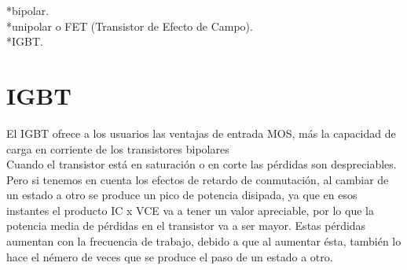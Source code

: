 \documentclass[12pt,a4paper]{article}
\begin{document}
*bipolar.\\
*unipolar o FET (Transistor de Efecto de Campo).\\
*IGBT.\\

\section{IGBT}
El IGBT ofrece a los usuarios las ventajas de entrada MOS, m\'as la capacidad de carga en corriente de los transistores bipolares\\

Cuando el transistor est\'a en saturaci\'on o en corte las p\'erdidas son despreciables. Pero si tenemos en cuenta los efectos de retardo de conmutaci\'on, al cambiar de un estado a otro se produce un pico de potencia disipada, ya que en esos instantes el producto IC x VCE va a tener un valor apreciable, por lo que la potencia media de p\'erdidas en el transistor va a ser mayor. Estas p\'erdidas aumentan con la frecuencia de trabajo, debido a que al aumentar \'esta, tambi\'en lo hace el n\'emero de veces que se produce el paso de un estado a otro.\\
\end{document}
